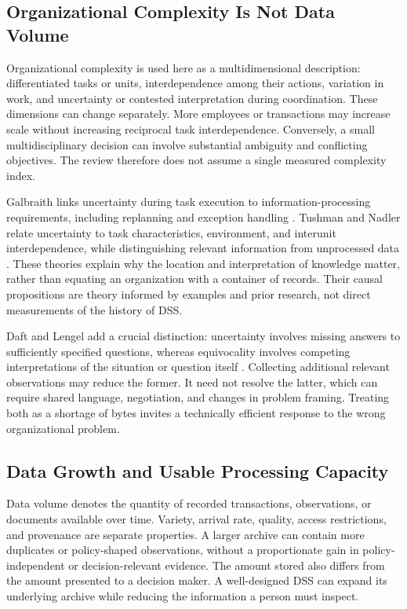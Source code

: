 \documentclass[journal]{IEEEtran}
\begin{document}
\subsection{Organizational Complexity Is Not Data Volume}
Organizational complexity is used here as a multidimensional description: differentiated tasks or units, interdependence among their actions, variation in work, and uncertainty or contested interpretation during coordination. These dimensions can change separately. More employees or transactions may increase scale without increasing reciprocal task interdependence. Conversely, a small multidisciplinary decision can involve substantial ambiguity and conflicting objectives. The review therefore does not assume a single measured complexity index.

Galbraith links uncertainty during task execution to information-processing requirements, including replanning and exception handling \cite{GALBRAITH1974}. Tushman and Nadler relate uncertainty to task characteristics, environment, and interunit interdependence, while distinguishing relevant information from unprocessed data \cite{TUSHMAN1978}. These theories explain why the location and interpretation of knowledge matter, rather than equating an organization with a container of records. Their causal propositions are theory informed by examples and prior research, not direct measurements of the history of DSS.

Daft and Lengel add a crucial distinction: uncertainty involves missing answers to sufficiently specified questions, whereas equivocality involves competing interpretations of the situation or question itself \cite{DAFT1986}. Collecting additional relevant observations may reduce the former. It need not resolve the latter, which can require shared language, negotiation, and changes in problem framing. Treating both as a shortage of bytes invites a technically efficient response to the wrong organizational problem.

\subsection{Data Growth and Usable Processing Capacity}
Data volume denotes the quantity of recorded transactions, observations, or documents available over time. Variety, arrival rate, quality, access restrictions, and provenance are separate properties. A larger archive can contain more duplicates or policy-shaped observations, without a proportionate gain in policy-independent or decision-relevant evidence. The amount stored also differs from the amount presented to a decision maker. A well-designed DSS can expand its underlying archive while reducing the information a person must inspect.
\end{document}
